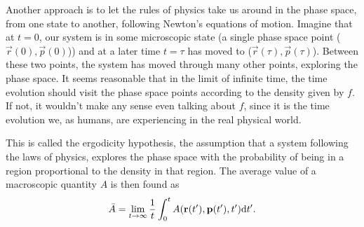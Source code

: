 Another approach is to let the rules of physics take us around in the phase space, from one state to another, following Newton's equations of motion. Imagine that at $t=0$, our system is in some microscopic state (a single phase space point ($\vec r(0), \vec p(0)$)) and at a later time $t=\tau$ has moved to ($\vec r(\tau), \vec p(\tau)$). Between these two points, the system has moved through many other points, exploring the phase space. It seems reasonable that in the limit of infinite time, the time evolution should visit the phase space points according to the density given by $f$. If not, it wouldn't make any sense even talking about $f$, since it is the time evolution we, as humans, are experiencing in the real physical world.

This is called the ergodicity hypothesis, the assumption that a system following the laws of physics, explores the phase space with the probability of being in a region proportional to the density in that region. The average value of a macroscopic quantity $A$ is then found as
\begin{align}
	\bar A = \lim_{t\rightarrow \infty} \frac{1}{t}\int_0^{t} A(\mathbf r(t'), \mathbf p(t'), t')\mathrm{d}t'.
\end{align}